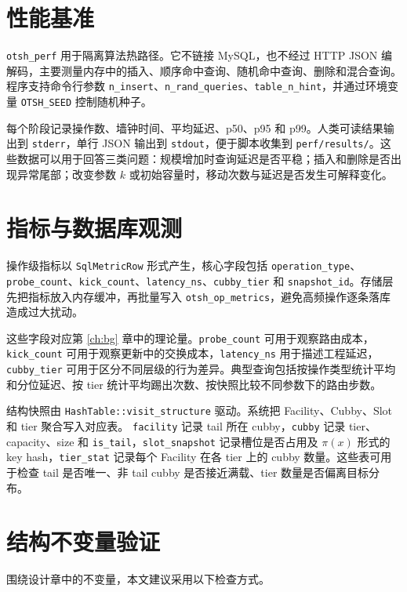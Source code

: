 \section{性能基准}
\texttt{otsh\_perf} 用于隔离算法热路径。它不链接 MySQL，也不经过 HTTP JSON 编解码，主要测量内存中的插入、顺序命中查询、随机命中查询、删除和混合查询。程序支持命令行参数 \texttt{n\_insert}、\texttt{n\_rand\_queries}、\texttt{table\_n\_hint}，并通过环境变量 \texttt{OTSH\_SEED} 控制随机种子。

每个阶段记录操作数、墙钟时间、平均延迟、p50、p95 和 p99。人类可读结果输出到 \texttt{stderr}，单行 JSON 输出到 \texttt{stdout}，便于脚本收集到 \texttt{perf/results/}。这些数据可以用于回答三类问题：规模增加时查询延迟是否平稳；插入和删除是否出现异常尾部；改变参数 \(k\) 或初始容量时，移动次数与延迟是否发生可解释变化。

\section{指标与数据库观测}
操作级指标以 \texttt{SqlMetricRow} 形式产生，核心字段包括 \texttt{operation\_type}、\texttt{probe\_count}、\texttt{kick\_count}、\texttt{latency\_ns}、\texttt{cubby\_tier} 和 \texttt{snapshot\_id}。存储层先把指标放入内存缓冲，再批量写入 \texttt{otsh\_op\_metrics}，避免高频操作逐条落库造成过大扰动。

这些字段对应第 \ref{ch:bg} 章中的理论量。\texttt{probe\_count} 可用于观察路由成本，\texttt{kick\_count} 可用于观察更新中的交换成本，\texttt{latency\_ns} 用于描述工程延迟，\texttt{cubby\_tier} 可用于区分不同层级的行为差异。典型查询包括按操作类型统计平均和分位延迟、按 tier 统计平均踢出次数、按快照比较不同参数下的路由步数。

结构快照由 \texttt{HashTable::visit\_structure} 驱动。系统把 Facility、Cubby、Slot 和 tier 聚合写入对应表。 \texttt{facility} 记录 tail 所在 cubby，\texttt{cubby} 记录 tier、capacity、size 和 \texttt{is\_tail}，\texttt{slot\_snapshot} 记录槽位是否占用及 \(\pi(x)\) 形式的 key hash，\texttt{tier\_stat} 记录每个 Facility 在各 tier 上的 cubby 数量。这些表可用于检查 tail 是否唯一、非 tail cubby 是否接近满载、tier 数量是否偏离目标分布。

\section{结构不变量验证}
围绕设计章中的不变量，本文建议采用以下检查方式。

